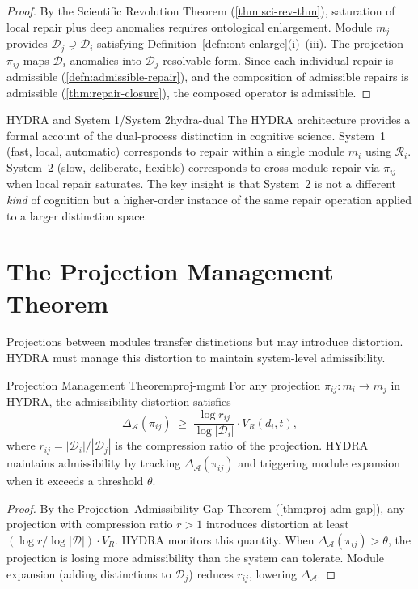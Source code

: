 \documentclass[12pt,twoside,openright]{book}
\newcommand{\csicon} {\marginpar{\tiny\color{DistBlue}\faCode}}
\newcommand{\adm}{\mathcal{A}}
\begin{document}
\begin{proof}
  By the Scientific Revolution Theorem
  (\cref{thm:sci-rev-thm}), saturation of local repair
  plus deep anomalies requires ontological enlargement.
  Module $m_j$ provides $\mathcal{D}_j \supsetneq
  \mathcal{D}_i$ satisfying
  Definition~\ref{defn:ont-enlarge}(i)--(iii).
  The projection $\pi_{ij}$ maps $\mathcal{D}_i$-anomalies
  into $\mathcal{D}_j$-resolvable form.
  Since each individual repair is admissible
  (\cref{defn:admissible-repair}), and the composition
  of admissible repairs is admissible
  (\cref{thm:repair-closure}), the composed operator is
  admissible.
\end{proof}

\begin{remark}{HYDRA and System 1/System 2}{hydra-dual}
  \csicon
  The HYDRA architecture provides a formal account of
  the dual-process distinction in cognitive science.
  System~1 (fast, local, automatic) corresponds to
  repair within a single module $m_i$ using $\mathcal{R}_i$.
  System~2 (slow, deliberate, flexible) corresponds to
  cross-module repair via $\pi_{ij}$ when local repair
  saturates. The key insight is that System~2 is not a
  different \emph{kind} of cognition but a higher-order
  instance of the same repair operation applied to a
  larger distinction space.
\end{remark}

\section{The Projection Management Theorem}

Projections between modules transfer distinctions but may
introduce distortion. HYDRA must manage this distortion
to maintain system-level admissibility.

\begin{theorem}{Projection Management Theorem}{proj-mgmt}
  For any projection $\pi_{ij} : m_i \to m_j$ in HYDRA,
  the admissibility distortion satisfies
  \[
    \Delta_\adm(\pi_{ij})
    \;\ge\;
    \frac{\log r_{ij}}{\log |\mathcal{D}_i|}
    \cdot V_R(d_i, t),
  \]
  where $r_{ij} = |\mathcal{D}_i| / |\mathcal{D}_j|$
  is the compression ratio of the projection.
  HYDRA maintains admissibility by tracking
  $\Delta_\adm(\pi_{ij})$ and triggering module expansion
  when it exceeds a threshold $\theta$.
\end{theorem}

\begin{proof}
  By the Projection--Admissibility Gap Theorem
  (\cref{thm:proj-adm-gap}), any projection with
  compression ratio $r > 1$ introduces distortion at
  least $(\log r / \log |\mathcal{D}|) \cdot V_R$.
  HYDRA monitors this quantity. When
  $\Delta_\adm(\pi_{ij}) > \theta$, the projection is
  losing more admissibility than the system can tolerate.
  Module expansion (adding distinctions to $\mathcal{D}_j$)
  reduces $r_{ij}$, lowering $\Delta_\adm$.
\end{proof}
\end{document}

